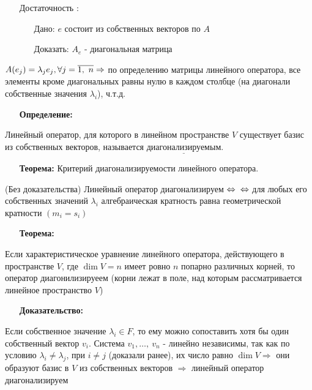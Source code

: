 \documentclass[12pt, letterpaper, twoside]{article}
\newcommand{\Underl}[1]{$\underline{\text{#1}}$}
\begin{document}
         \newpage
         \begin{enumerate}
            \item[Достаточность]:
            \begin{enumerate}
                \item[Дано:] $e$ состоит из собственных векторов по $A$ 
                \item[Доказать:] $A_e$ - диагональная матрица
            \end{enumerate}
         \end{enumerate}
         $A(e_j) = \lambda_j e_j,\\ \forall j = \overline{1,\ n}\Rightarrow $ по определению матрицы линейного оператора, все элементы кроме диагональных равны нулю в каждом столбце (на диагонали собственные значения $\lambda_i$), ч.т.д.
         \begin{enumerate}
            \item[\textbf{Определение:}]
         \end{enumerate}
         Линейный оператор, для которого в линейном пространстве $V$ существует базис из собственных векторов, называется \Underl{диагонализируемым}.
         \begin{enumerate}
            \item[\textbf{Теорема:}] Критерий диагонализируемости линейного оператора.
         \end{enumerate}
         (Без доказательства) Линейный оператор диагонализируем $\Leftrightarrow\\
         \Leftrightarrow$ для любых его собственных значений $\lambda_i$ алгебраическая кратность равна геометрической кратности $(m_i = s_i)$
         \begin{enumerate}
            \item[\textbf{Теорема:}]
         \end{enumerate}
         Если характеристическое уравнение линейного оператора, действующего в пространстве $V$, где $\dim V = n$ имеет ровно $n$ попарно различных корней, то оператор диагонилизируеем (корни лежат в поле, над которым рассматривается линейное пространство $V$)
         \begin{enumerate}
            \item[\textbf{Доказательство:}]
         \end{enumerate}
         Если собственное значение $\lambda_i\in F$, то ему можно сопоставить хотя бы один собственный вектор $v_i$. Система $v_1,\dots,\ v_n$ - линейно независимы, так как по условию $\lambda_i \neq \lambda_j$, при $i \neq j$ (доказали ранее), их число равно $\dim V\Rightarrow$ они образуют базис в $V$ из собственных векторов $\Rightarrow$ линейный оператор диагонализируем\newpage
\end{document}
